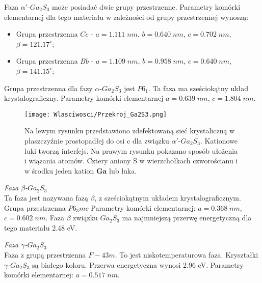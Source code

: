 Faza $\alpha'$-$Ga_{2}S_{3}$ może posiadać dwie grupy przestrzenne. Parametry komórki elementarnej dla tego materiału w zależności od grupy przestrzennej wynoszą:
\begin{itemize}
	\item Grupa przestrzenna $Cc$ - $a=1.111\;nm$, $b=0.640\;nm$, $c=0.702\;nm$, $\beta=121.17^{\circ}$;
	\item Grupa przestrzenna $Bb$ -  $a=1.109\;nm$, $b=0.958\;nm$, $c=0.640\;nm$, $\beta=141.15^{\circ}$;
\end{itemize}

Grupa przestrzenna dla fazy $\alpha$-$Ga_{2}S_{3}$ jest $P6_1$. Ta faza ma sześciokątny układ krystalograficzny. Parametry komórki elementarnej $a=0.639\;nm$, $c=1.804\;nm$.

\begin{figure}[H]
	\begin{center}
		\texttt{[image: Wlasciwosci/Przekroj\_Ga2S3.png]}
		\caption{Na lewym rysunku przedstawiono zdefektowaną sieć krystaliczną w płaszczyźnie prostopadłej do osi c dla związku $\alpha'$-$Ga_{2}S_{3}$. Kationowe luki tworzą interfejs. Na prawym rysunku pokazano sposób ułożenia i wiązania atomów. Cztery aniony S w wierzchołkach czworościanu i w środku jeden kation $\mathbf{Ga}$ lub luka.}
	\end{center}
\end{figure}

\textit{Faza $\beta$-$Ga_{2}S_{3}$} \\
Ta faza jest nazywana fazą $\beta$, z sześciokątnym układem krystalograficznym. Grupa przestrzenna $P6_{3}mc$ Parametry komórki elementarnej: $a=0.368\;nm$,  $c=0.602\;nm$. Faza $\beta$ związku $Ga_{2}S_{3}$ ma najmniejszą przerwę energetyczną dla tego materiału 2.48 eV.

\textit{Faza $\gamma$-$Ga_{2}S_{3}$} \\
Faza z grupą przestrzenna $F-43m$. To jest niskotemperaturowa faza. Kryształki $\gamma$-$Ga_{2}S_{3}$ są białego koloru. Przerwa energetyczna wynosi 2.96 eV. Parametry komórki elementarnej: $a=0.517\;nm$.

